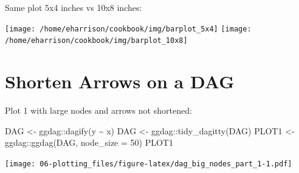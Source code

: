 \documentclass[
]{book}
\newenvironment{Shaded}{\begin{snugshade}}{\end{snugshade}}
\newcommand{\AttributeTok}[1]{\textcolor[rgb]{0.77,0.63,0.00}{#1}}
\newcommand{\DecValTok}[1]{\textcolor[rgb]{0.00,0.00,0.81}{#1}}
\newcommand{\FunctionTok}[1]{\textcolor[rgb]{0.00,0.00,0.00}{#1}}
\newcommand{\NormalTok}[1]{#1}
\newcommand{\OtherTok}[1]{\textcolor[rgb]{0.56,0.35,0.01}{#1}}
\newcommand{\SpecialCharTok}[1]{\textcolor[rgb]{0.00,0.00,0.00}{#1}}
\begin{document}
Same plot 5x4 inches vs 10x8 inches:

\texttt{[image: /home/eharrison/cookbook/img/barplot\_5x4]}
\texttt{[image: /home/eharrison/cookbook/img/barplot\_10x8]}

\hypertarget{shorten-arrows-on-a-dag}{%
\section{Shorten Arrows on a DAG}\label{shorten-arrows-on-a-dag}}

Plot 1 with large nodes and arrows not shortened:

\begin{Shaded}
\begin{Highlighting}[]
\NormalTok{DAG }\OtherTok{\textless{}{-}}\NormalTok{ ggdag}\SpecialCharTok{::}\FunctionTok{dagify}\NormalTok{(y }\SpecialCharTok{\textasciitilde{}}\NormalTok{ x)}
\NormalTok{DAG }\OtherTok{\textless{}{-}}\NormalTok{ ggdag}\SpecialCharTok{::}\FunctionTok{tidy\_dagitty}\NormalTok{(DAG)}
\NormalTok{PLOT1 }\OtherTok{\textless{}{-}}\NormalTok{ ggdag}\SpecialCharTok{::}\FunctionTok{ggdag}\NormalTok{(DAG, }\AttributeTok{node\_size =} \DecValTok{50}\NormalTok{)}
\NormalTok{PLOT1}
\end{Highlighting}
\end{Shaded}

\texttt{[image: 06-plotting\_files/figure-latex/dag\_big\_nodes\_part\_1-1.pdf]}
\end{document}
